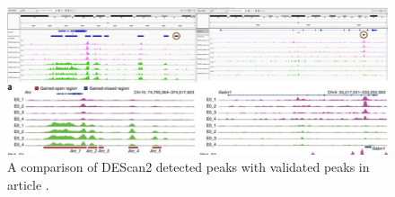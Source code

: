 \begin{figure}[H]
\includegraphics[width=\textwidth,height=\textheight,keepaspectratio]{img/descan2/peaks.png}
\caption{A comparison of DEScan2 detected peaks with validated peaks in article \cite{Su2017}.}
\label{fig:peaksdescan}
\centering
\end{figure}
